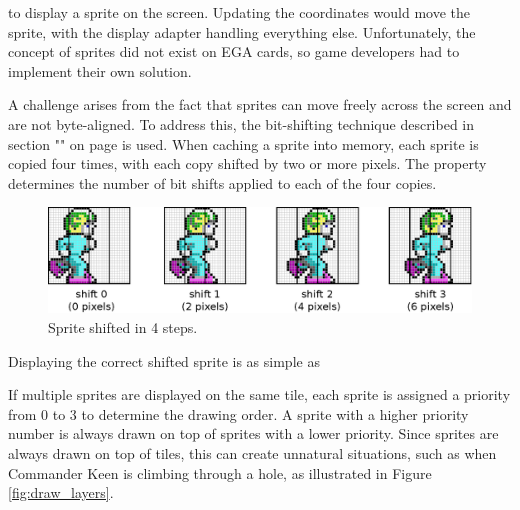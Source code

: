 \documentclass[book.tex]{subfiles}
\begin{document}
\par
to display a sprite on the screen. Updating the  coordinates would move the sprite, with the display adapter handling everything else. Unfortunately, the concept of sprites did not exist on EGA cards, so game developers had to implement their own solution.\\

\par
A challenge arises from the fact that sprites can move freely across the screen and are not byte-aligned. To address this, the bit-shifting technique described in section "" on page \pageref{section:bitshifting} is used. When caching a sprite into memory, each sprite is copied four times, with each copy shifted by two or more pixels. The property  determines the number of bit shifts applied to each of the four copies.\\


\begin{figure}[H]
  \centering
  \includegraphics[width=\textwidth]{imgs/drawings/sprite_shift.eps}
  \caption{Sprite shifted in 4 steps.}
  \label{fig:sprite_shift}  
\end{figure}

\par
Displaying the correct shifted sprite is as simple as\\
\par
\begin{minipage}{\textwidth}
  
  \end{minipage}
  \label{sprite_shift}  

\par 
\begin{minipage}{\textwidth}
  
  \end{minipage}
  \label{shift_sprite}
  

\pagebreak
If multiple sprites are displayed on the same tile, each sprite is assigned a priority from 0 to 3 to determine the drawing order. A sprite with a higher priority number is always drawn on top of sprites with a lower priority. Since sprites are always drawn on top of tiles, this can create unnatural situations, such as when Commander Keen is climbing through a hole, as illustrated in Figure \ref{fig:draw_layers}.\\
\end{document}
